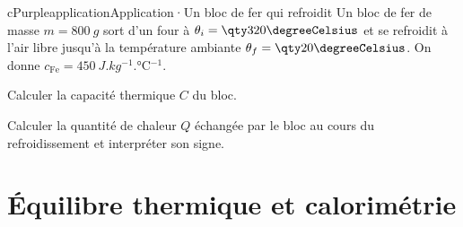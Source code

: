 \begin{rub}[unbreakable]{cPurple}{application}{Application\enspace·\enspace Un bloc de fer qui refroidit}
Un bloc de fer de masse $m = \qty{800}{g}$ sort d’un four à $\theta_i = \dC{320}$ et se refroidit à l’air libre jusqu’à la température ambiante $\theta_f = \dC{20}$. On donne $c_{\mathrm{Fe}} = \qty{450}{J.kg^{-1}.\degreeCelsius^{-1}}$.
\begin{appq}
  \item Calculer la capacité thermique $C$ du bloc.
  \item Calculer la quantité de chaleur $Q$ échangée par le bloc au cours du refroidissement et interpréter son signe.
\end{appq}
\end{rub}

\needspace{15cm}
\section{Équilibre thermique et calorimétrie}

